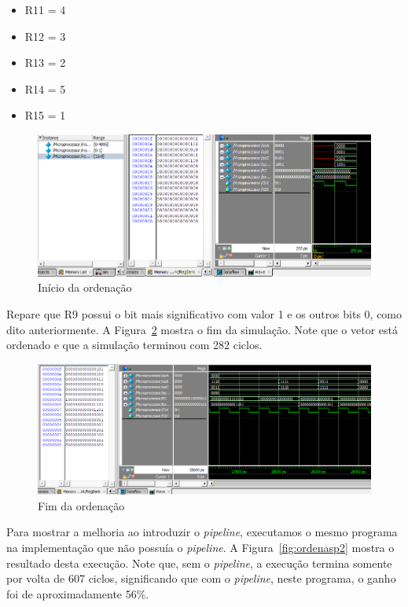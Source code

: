 \documentclass[11pt,a4paper,titlepage]{article}
\begin{document}
\begin{itemize}
\item R11 = 4
\item R12 = 3
\item R13 = 2
\item R14 = 5
\item R15 = 1
\end{itemize}

\begin{figure}[!h]
\centering
\includegraphics[scale=0.5]{images/ordena1.png}
\caption{Início da ordenação}
\label{fig:ordena1}
\end{figure}

Repare que R9 possui o bit mais significativo com valor 1 e os outros bits 0, como dito anteriormente. A Figura~\ref{fig:ordena2} mostra o fim da simulação. Note que o vetor está ordenado e que a simulação terminou com 282 ciclos.

\begin{figure}[!h]
\centering
\includegraphics[scale=0.5]{images/ordena2.png}
\caption{Fim da ordenação}
\label{fig:ordena2}
\end{figure}

Para mostrar a melhoria ao introduzir o \textit{pipeline}, executamos o mesmo programa na implementação que não possuía o \textit{pipeline}. A Figura~\ref{fig:ordenasp2} mostra o resultado desta execução. Note que, sem o \textit{pipeline}, a execução termina somente por volta de 607 ciclos, significando que com o \textit{pipeline}, neste programa, o ganho foi de aproximadamente 56\%.
\end{document}
